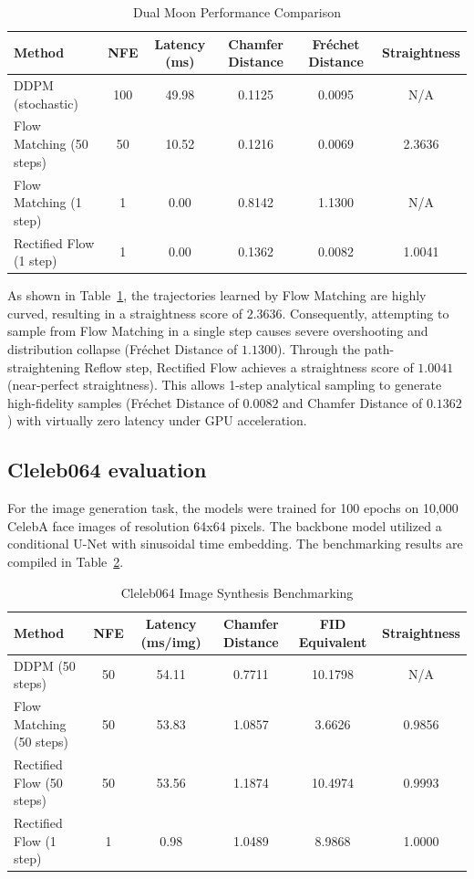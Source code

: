 \documentclass[11pt,a4paper]{article}
\begin{document}
\begin{table}[h]
\centering
\caption{Dual Moon Performance Comparison}
\label{tab:moons_results}
\vspace{0.2cm}
\small
\begin{tabular}{lccccc}
\toprule
\textbf{Method} & \textbf{NFE} & \textbf{Latency (ms)} & \textbf{Chamfer Distance} & \textbf{Fr\'echet Distance} & \textbf{Straightness} \\
\midrule
DDPM (stochastic) & 100 & 49.98 & 0.1125 & 0.0095 & N/A \\
Flow Matching (50 steps) & 50 & 10.52 & 0.1216 & 0.0069 & 2.3636 \\
Flow Matching (1 step) & 1 & 0.00 & 0.8142 & 1.1300 & N/A \\
Rectified Flow (1 step) & 1 & 0.00 & 0.1362 & 0.0082 & 1.0041 \\
\bottomrule
\end{tabular}
\end{table}

As shown in Table~\ref{tab:moons_results}, the trajectories learned by Flow Matching are highly curved, resulting in a straightness score of $2.3636$. Consequently, attempting to sample from Flow Matching in a single step causes severe overshooting and distribution collapse (Fr\'echet Distance of $1.1300$). Through the path-straightening Reflow step, Rectified Flow achieves a straightness score of $1.0041$ (near-perfect straightness). This allows 1-step analytical sampling to generate high-fidelity samples (Fr\'echet Distance of $0.0082$ and Chamfer Distance of $0.1362$) with virtually zero latency under GPU acceleration.

\subsection{Cleleb064 evaluation}
For the image generation task, the models were trained for 100 epochs on 10,000 CelebA face images of resolution 64x64 pixels. The backbone model utilized a conditional U-Net with sinusoidal time embedding. The benchmarking results are compiled in Table~\ref{tab:celeba_results}.

\begin{table}[h]
\centering
\caption{Cleleb064 Image Synthesis Benchmarking}
\label{tab:celeba_results}
\vspace{0.2cm}
\small
\begin{tabular}{lccccc}
\toprule
\textbf{Method} & \textbf{NFE} & \textbf{Latency (ms/img)} & \textbf{Chamfer Distance} & \textbf{FID Equivalent} & \textbf{Straightness} \\
\midrule
DDPM (50 steps) & 50 & 54.11 & 0.7711 & 10.1798 & N/A \\
Flow Matching (50 steps) & 50 & 53.83 & 1.0857 & 3.6626 & 0.9856 \\
Rectified Flow (50 steps) & 50 & 53.56 & 1.1874 & 10.4974 & 0.9993 \\
Rectified Flow (1 step) & 1 & 0.98 & 1.0489 & 8.9868 & 1.0000 \\
\bottomrule
\end{tabular}
\end{table}
\end{document}
